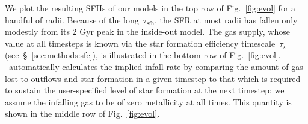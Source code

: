 \documentclass[draft2.tex]{subfiles}
\begin{document}
We plot the resulting SFHs of our models in the top row of Fig.~\ref{fig:evol} 
for a handful of radii. 
Because of the long~$\tau_\text{sfh}$, the SFR at most radii has fallen only 
modestly from its 2 Gyr peak in the inside-out model. 
{\color{red} 
The gas supply, whose value at all timesteps is known via the star formation 
efficiency timescale~$\tau_\star$ (see~\S~\ref{sec:methods:sfe}), is 
illustrated in the bottom row of Fig.~\ref{fig:evol}. 
}
\vice~automatically calculates the implied infall rate by comparing the amount 
of gas lost to outflows and star formation in a given timestep to that which is 
required to sustain the user-specified level of star formation at the next 
timestep; we assume the infalling gas to be of zero metallicity at all times. 
This quantity is shown in the middle row of Fig.~\ref{fig:evol}. 
\end{document}
